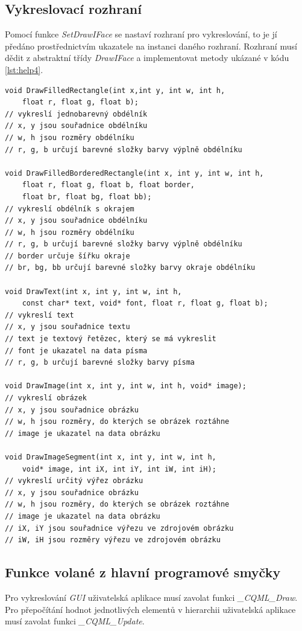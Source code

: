 \documentclass[11pt,twoside,a4paper]{book}
\begin{document}
\subsection{\label{SEC:drawI}Vykreslovací rozhraní}
Pomocí funkce \textit{SetDrawIFace} se nastaví rozhraní pro vykreslování, to je jí předáno prostřednictvím ukazatele na instanci daného rozhraní. Rozhraní musí dědit z abstraktní třídy \textit{DrawIFace} a implementovat metody ukázané v kódu \ref{lst:help4}.
\begin{lstlisting}[float,frame=single,caption=Metody vykreslovacího rozhraní.,label=lst:help4]
void DrawFilledRectangle(int x,int y, int w, int h,
	float r, float g, float b);
// vykreslí jednobarevný obdélník
// x, y jsou souřadnice obdélníku
// w, h jsou rozměry obdélníku
// r, g, b určují barevné složky barvy výplně obdélníku

void DrawFilledBorderedRectangle(int x, int y, int w, int h, 
	float r, float g, float b, float border, 
	float br, float bg, float bb);
// vykreslí obdélník s okrajem
// x, y jsou souřadnice obdélníku
// w, h jsou rozměry obdélníku
// r, g, b určují barevné složky barvy výplně obdélníku
// border určuje šířku okraje
// br, bg, bb určují barevné složky barvy okraje obdélníku

void DrawText(int x, int y, int w, int h, 
	const char* text, void* font, float r, float g, float b);
// vykreslí text
// x, y jsou souřadnice textu
// text je textový řetězec, který se má vykreslit
// font je ukazatel na data písma
// r, g, b určují barevné složky barvy písma

void DrawImage(int x, int y, int w, int h, void* image);
// vykreslí obrázek
// x, y jsou souřadnice obrázku
// w, h jsou rozměry, do kterých se obrázek roztáhne
// image je ukazatel na data obrázku

void DrawImageSegment(int x, int y, int w, int h,
	void* image, int iX, int iY, int iW, int iH);
// vykreslí určitý výřez obrázku
// x, y jsou souřadnice obrázku
// w, h jsou rozměry, do kterých se obrázek roztáhne
// image je ukazatel na data obrázku
// iX, iY jsou souřadnice výřezu ve zdrojovém obrázku
// iW, iH jsou rozměry výřezu ve zdrojovém obrázku
\end{lstlisting}

\subsection{\label{SEC:updateDraw}Funkce volané z hlavní programové smyčky}
Pro vykreslování \textit{GUI} uživatelská aplikace musí zavolat funkci \textit{\_CQML\_Draw}. Pro přepočítání hodnot jednotlivých elementů v hierarchii uživatelská aplikace musí zavolat funkci \textit{\_CQML\_Update}.
\end{document}
